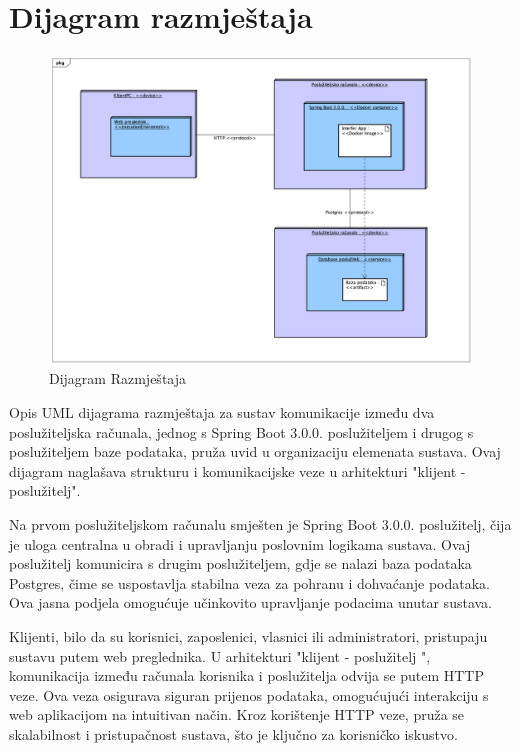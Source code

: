 		\section{Dijagram razmještaja}
			
\begin{figure}[H]
	\includegraphics[scale=0.3]{slike/dijagram_razmjestaja.jpeg}
	\centering
	\caption{Dijagram Razmještaja}
	\label{fig:dijagram_razmjestaja}
\end{figure}

Opis UML dijagrama razmještaja za sustav komunikacije između dva 
poslužiteljska računala, jednog s Spring Boot 3.0.0. poslužiteljem i drugog s 
poslužiteljem baze podataka, pruža uvid u organizaciju elemenata sustava. Ovaj 
dijagram naglašava strukturu i komunikacijske veze u arhitekturi "klijent - 
poslužitelj".

Na prvom poslužiteljskom računalu smješten je Spring Boot 3.0.0. poslužitelj, 
čija je uloga centralna u obradi i upravljanju poslovnim logikama sustava. 
Ovaj poslužitelj komunicira s drugim poslužiteljem, gdje se nalazi baza 
podataka Postgres, čime se uspostavlja stabilna veza za pohranu i dohvaćanje 
podataka. Ova jasna podjela omogućuje učinkovito upravljanje podacima unutar 
sustava.

Klijenti, bilo da su korisnici, zaposlenici, vlasnici ili administratori, 
pristupaju sustavu putem web preglednika. U arhitekturi "klijent - poslužitelj
", komunikacija između računala korisnika i poslužitelja odvija se putem HTTP 
veze. Ova veza osigurava siguran prijenos podataka, omogućujući interakciju s 
web aplikacijom na intuitivan način. Kroz korištenje HTTP veze, pruža se 
skalabilnost i pristupačnost sustava, što je ključno za korisničko 
iskustvo.


